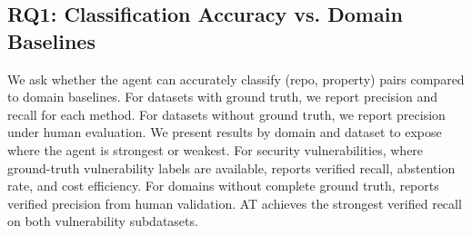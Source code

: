 \documentclass{article}
\theoremstyle{plain}
\theoremstyle{definition}
\theoremstyle{remark}
\begin{document}
\subsection{RQ1: Classification Accuracy vs. Domain Baselines}
We ask whether the agent can accurately classify (repo, property) pairs compared to domain baselines.
For datasets with ground truth, we report precision and recall for each method.
For datasets without ground truth, we report precision under human evaluation.
We present results by domain and dataset to expose where the agent is strongest or weakest.
For security vulnerabilities, where ground-truth vulnerability labels are available,  reports verified recall, abstention rate, and cost efficiency.
For domains without complete ground truth,  reports verified precision from human validation.
AT achieves the strongest verified recall on both vulnerability subdatasets.
\end{document}
